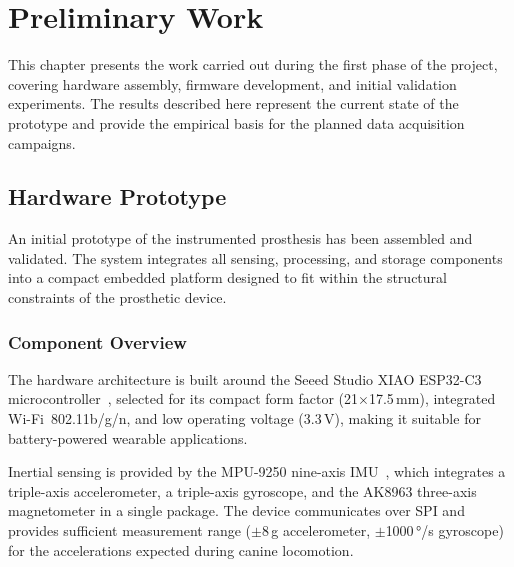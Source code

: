 %

\newcommand{\figplaceholder}[2][8cm]{%
  \fbox{\begin{minipage}[c][#1][c]{0.85\textwidth}
    \centering\textit{[TODO figure: #2]}
  \end{minipage}}%
}

\chapter{Preliminary Work}
\label{chapter:preliminary}

This chapter presents the work carried out during the first phase of the project,
covering hardware assembly, firmware development, and initial validation experiments.
The results described here represent the current state of the prototype and provide
the empirical basis for the planned data acquisition campaigns.

\section{Hardware Prototype}
\label{section:hw_prototype}

An initial prototype of the instrumented prosthesis has been assembled and validated.
The system integrates all sensing, processing, and storage components into a compact
embedded platform designed to fit within the structural constraints of the prosthetic device.

\subsection{Component Overview}

The hardware architecture is built around the Seeed Studio XIAO ESP32-C3
microcontroller~\cite{ESP32C3}, selected for its compact form factor
(21$\times$17.5\,mm), integrated Wi-Fi~802.11b/g/n, and low operating voltage
(3.3\,V), making it suitable for battery-powered wearable applications.

Inertial sensing is provided by the MPU-9250 nine-axis IMU~\cite{MPU9250},
which integrates a triple-axis accelerometer, a triple-axis gyroscope, and the
AK8963 three-axis magnetometer in a single package.
The device communicates over SPI and provides sufficient measurement range
($\pm$8\,g accelerometer, $\pm$1000\,°/s gyroscope) for the accelerations
expected during canine locomotion.

